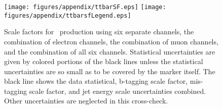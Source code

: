  \begin{figure}[!h!tpb]
 \centering
 \texttt{[image: figures/appendix/ttbarSF.eps]}
 \texttt{[image: figures/appendix/ttbarsfLegend.eps]}
 \caption{Scale factors for \ttbar~production using six separate channels, the combination of electron channels, the combination of muon channels, and the combination of all six channels.  Statistical uncertainties are given by colored portions of the black lines unless the statistical uncertainties are so small as to be covered by the marker itself.  The black line shows the data statistical, b-tagging scale factor, mis-tagging scale factor, and jet energy scale uncertainties combined.  Other uncertainties are neglected in this cross-check.}
 \label{fig:ttbarsf}
 \end{figure}
